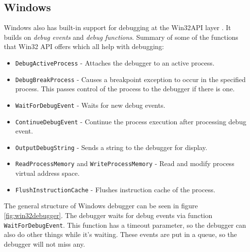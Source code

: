 \subsection{Windows}
Windows also has built-in support for debugging at the Win32API layer \cite{windows-msdn-debugging-api, windows-press-debugging-api}.
It builds on \textit{debug events} and \textit{debug functions}. Summary of some of the functions that Win32 API offers which all help with debugging:

\begin{itemize}
    \item \texttt{DebugActiveProcess} - Attaches the debugger to an active process.
    \item \texttt{DebugBreakProcess} - Causes a breakpoint exception to occur in the specified process.
                                          This passes control of the process to the debugger if there is one.
    \item \texttt{WaitForDebugEvent} - Waits for new debug events.
    \item \texttt{ContinueDebugEvent} - Continue the process execution after processing debug event.
    \item \texttt{OutputDebugString} - Sends a string to the debugger for display.
    \item \texttt{ReadProcessMemory} and \texttt{WriteProcessMemory} - Read and modify process virtual address space.
    \item \texttt{FlushInstructionCache} - Flushes instruction cache of the process.
\end{itemize}

The general structure of Windows debugger can be seen in figure \ref{fig:win32debugger}.
The debugger waits for debug events via function \texttt{WaitForDebugEvent}.
This function has a timeout parameter, so the debugger can also do other things while it's waiting.
These events are put in a queue, so the debugger will not miss any.

